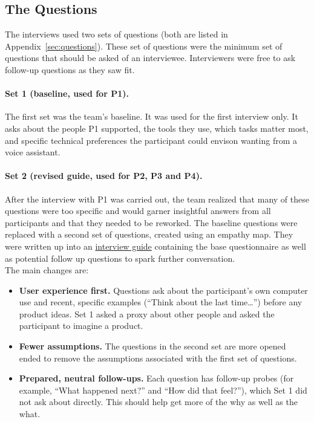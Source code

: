 \documentclass[12pt, titlepage]{article}
\begin{document}
\subsection{The Questions}

The interviews used two sets of questions (both are listed in Appendix~\ref{sec:questions}). These set of questions were the minimum set of questions
that should be asked of an interviewee. Interviewers were free to ask follow-up questions as they saw fit. 

\paragraph{Set 1 (baseline, used for P1).} The first set was the team's baseline. It was used for the first interview only. It asks about the people P1 supported, 
the tools they use, which tasks matter most, and specific technical preferences the participant could envison wanting from a voice assistant.

\paragraph{Set 2 (revised guide, used for P2, P3 and P4).}
After the interview with P1 was carried out, the team realized that many of these questions were too specific and would garner insightful answers from
all participants and that they needed to be reworked. The baseline questions were replaced with a second set of questions, created using an empathy map.
They were written up into an \href{https://github.com/NaturalControl/natural-control/blob/main/pdfs/CDs/Interviews/UserInterviewGuide.pdf}{interview guide}
containing the base questionnaire as well as potential follow up questions to spark further conversation.\\

\noindent The main changes are:
\begin{itemize}
    \item \textbf{User experience first.} Questions ask about the participant's own computer use and recent, specific examples (``Think about the last time\ldots'') before any product ideas. Set 1 asked a proxy about other people and asked the participant to imagine a product.
    \item \textbf{Fewer assumptions.} The questions in the second set are more opened ended to remove the assumptions associated with the first set of questions.
    \item \textbf{Prepared, neutral follow-ups.} Each question has follow-up probes (for example, ``What happened next?'' and ``How did that feel?''), which Set 1 did not ask about directly. This should help get more of the why as well as the what.
\end{itemize}
\end{document}
